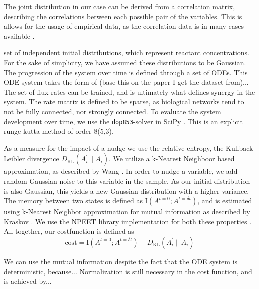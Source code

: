 \documentclass[../main.tex]{subfiles}
\begin{document}
The joint distribution in our case can be derived from a correlation matrix, describing the correlations between each possible pair of the variables.
This is allows for the usage of empirical data, as the correlation data is in many cases available \cite{}.

set of independent initial distributions, which represent reactant concentrations.
For the sake of simplicity, we have assumed these distributions to be Gaussian.
The progression of the system over time is defined through a set of ODEs.
This ODE system takes the form of (base this on the paper I get the dataset from)...
The set of flux rates can be trained, and is ultimately what defines synergy in the system.
The rate matrix is defined to be sparse, as biological networks tend to not be fully connected, nor strongly connected.
To evaluate the system development over time, we use the \texttt{dop853}-solver in SciPy \cite{scipy}.
This is an explicit runge-kutta method of order 8(5,3).

As a measure for the impact of a nudge we use the relative entropy, the Kullback-Leibler divergence $D_\mathrm{KL}(A_i^\prime \| A_i)$.
We utilize a k-Nearest Neighboor based approximation, as described by Wang \cite{wang2009divergence}.
In order to nudge a variable, we add random Gaussian noise to this variable in the sample.
As our initial distribution is also Gaussian, this yields a new Gaussian distribution with a higher variance.
The memory between two states is defined as $\mathrm{I}(A^{t=0};A^{t = \delta t})$, and is estimated using k-Nearest Neighbor approximation for mutual information as described by Kraskov \cite{kraskov2004estimating}.
We use the NPEET library implementation for both these properties \cite{versteeg2013NPEET}.
All together, our costfunction is defined as
%
\begin{equation}
\mathrm{cost} = \mathrm{I}(A^{t=0};A^{t = \delta t}) - D_\mathrm{KL}(A_i^\prime \| A_i)
\end{equation}
%

We can use the mutual information despite the fact that the ODE system is deterministic, because...
Normalization is still necessary in the cost function, and is achieved by...
\end{document}
